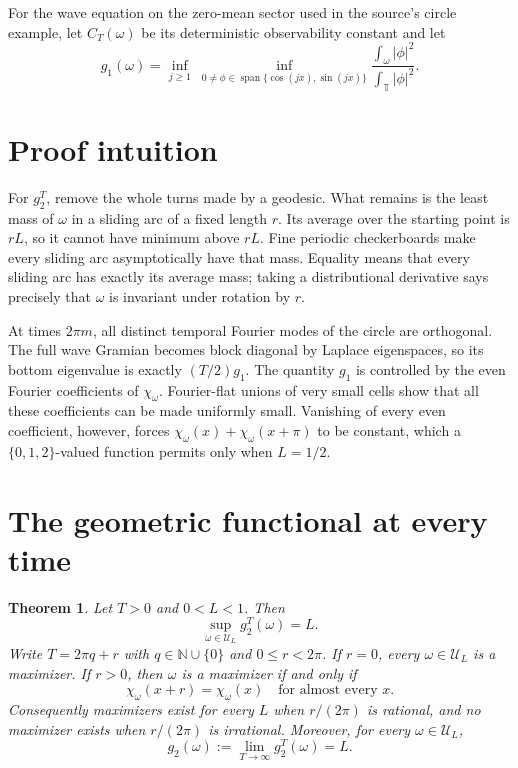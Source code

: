 \documentclass[11pt]{article}
\newtheorem{theorem}{Theorem}
\newcommand{\Torus}{\mathbb T}
\newcommand{\N}{\mathbb N}
\newcommand{\Ucal}{\mathcal U}
\begin{document}
For the wave equation on the zero-mean sector used in the source's circle
example, let $C_T(\omega)$ be its deterministic observability constant and let
\[
 g_1(\omega)=\inf_{j\geq1}\ \inf_{0\neq\phi\in
 \operatorname{span}\{\cos(jx),\sin(jx)\}}
 \frac{\int_\omega|\phi|^2}{\int_\Torus|\phi|^2}.
\]

\section*{Proof intuition}

For $g_2^T$, remove the whole turns made by a geodesic.  What remains is the
least mass of $\omega$ in a sliding arc of a fixed length $r$.  Its average over
the starting point is $rL$, so it cannot have minimum above $rL$.  Fine
periodic checkerboards make every sliding arc asymptotically have that mass.
Equality means that every sliding arc has exactly its average mass; taking a
distributional derivative says precisely that $\omega$ is invariant under
rotation by $r$.

At times $2\pi m$, all distinct temporal Fourier modes of the circle are
orthogonal.  The full wave Gramian becomes block diagonal by Laplace
eigenspaces, so its bottom eigenvalue is exactly $(T/2)g_1$.  The quantity
$g_1$ is controlled by the even Fourier coefficients of $\chi_\omega$.
Fourier-flat unions of very small cells show that all these coefficients can
be made uniformly small.  Vanishing of every even coefficient, however,
forces $\chi_\omega(x)+\chi_\omega(x+\pi)$ to be constant, which a
$\{0,1,2\}$-valued function permits only when $L=1/2$.

\section*{The geometric functional at every time}

\begin{theorem}\label{thm:g2}
Let $T>0$ and $0<L<1$.  Then
\[
 \sup_{\omega\in\Ucal_L}g_2^T(\omega)=L.
\]
Write $T=2\pi q+r$ with $q\in\N\cup\{0\}$ and $0\leq r<2\pi$.
If $r=0$, every $\omega\in\Ucal_L$ is a maximizer.  If $r>0$, then
$\omega$ is a maximizer if and only if
\begin{equation}\label{eq:invariance}
 \chi_\omega(x+r)=\chi_\omega(x)\quad\text{for almost every }x.
\end{equation}
Consequently maximizers exist for every $L$ when $r/(2\pi)$ is rational, and
no maximizer exists when $r/(2\pi)$ is irrational.  Moreover, for every
$\omega\in\Ucal_L$,
\[
 g_2(\omega):=\lim_{T\to\infty}g_2^T(\omega)=L.
\]
\end{theorem}
\end{document}
